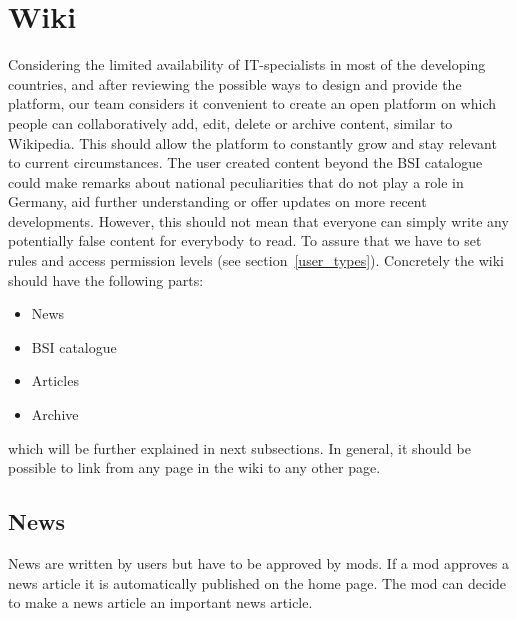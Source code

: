 \section{Wiki } 
Considering the limited availability of IT-specialists in most of the developing countries, and after reviewing the possible ways to design and provide the platform, our team considers it convenient to create an open platform on which people can collaboratively add, edit, delete or archive content, similar to Wikipedia. 
This should allow the platform to constantly grow and stay relevant to current circumstances. 
The user created content beyond the BSI catalogue could make remarks about national peculiarities that do not play a role in Germany, aid further understanding or offer updates on more recent developments.
However, this should not mean that everyone can simply write any potentially false content for everybody to read. 
To assure that we have to set rules and access permission levels (see section~\ref{user_types}). 
Concretely the wiki should have the following parts:
\begin{itemize}
    \item News
    \item BSI catalogue
    \item Articles
    \item Archive
\end{itemize}
which will be further explained in next subsections.
In general, it should be possible to link from any page in the wiki to any other page. 


\subsection{News}
News are written by users but have to be approved by mods.
If a mod approves a news article it is automatically published on the home page.
The mod can decide to make a news article an important news article.

